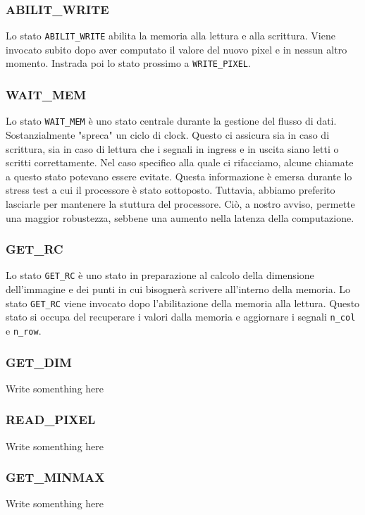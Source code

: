 \documentclass[11pt, a4paper]{article}
\begin{document}
\subsubsection{ABILIT\_WRITE}
Lo stato \texttt{ABILIT\_WRITE} abilita la memoria alla lettura e alla scrittura. Viene invocato subito dopo aver computato il valore del nuovo pixel e in nessun altro momento. Instrada poi lo stato prossimo a \texttt{WRITE\_PIXEL}.

\subsubsection{WAIT\_MEM}
Lo stato \texttt{WAIT\_MEM} è uno stato centrale durante la gestione del flusso di dati. Sostanzialmente "spreca" un ciclo di clock. Questo ci assicura sia in caso di scrittura, sia in caso di lettura che i segnali in ingress e in uscita siano letti o scritti correttamente. Nel caso specifico alla quale ci rifacciamo, alcune chiamate a questo stato potevano essere evitate. Questa informazione è emersa durante lo stress test a cui il processore è stato sottoposto. Tuttavia, abbiamo preferito lasciarle per mantenere la stuttura del processore. Ciò, a nostro avviso, permette una maggior robustezza, sebbene una aumento nella latenza della computazione.

\subsubsection{GET\_RC}
Lo stato \texttt{GET\_RC} è uno stato in preparazione al calcolo della dimensione dell'immagine e dei punti in cui bisognerà scrivere all'interno della memoria. Lo stato \texttt{GET\_RC} viene invocato dopo l'abilitazione della memoria alla lettura. Questo stato si occupa del recuperare i valori dalla memoria e aggiornare i segnali \texttt{n\_col} e \texttt{n\_row}.

\subsubsection{GET\_DIM}
Write somenthing here

\subsubsection{READ\_PIXEL}
Write somenthing here

\subsubsection{GET\_MINMAX}
Write somenthing here
\end{document}
